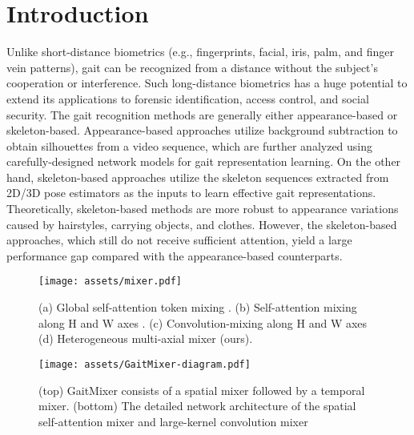 \documentclass{article}
\begin{document}
\section{Introduction}
Unlike short-distance biometrics (e.g., fingerprints, facial, iris, palm, and finger vein patterns), gait can be recognized from a distance without the subject's cooperation or interference.
Such long-distance biometrics has a huge potential to extend its applications to forensic identification, access control, and social security. The gait recognition methods are generally  either appearance-based or skeleton-based. Appearance-based approaches \cite{GaitNet}\cite{GaitSet}\cite{GaitPart}\cite{cross_view_cnn_silhouette} utilize background subtraction to obtain silhouettes from a video sequence, which are further analyzed using carefully-designed network models for gait representation learning. 
On the other hand, skeleton-based approaches \cite{PTSN}\cite{GaitGraph}\cite{GaitGraph2} utilize the skeleton sequences extracted from 2D/3D pose estimators as the inputs to learn effective gait representations. Theoretically,  skeleton-based methods are more robust to appearance variations caused by hairstyles, carrying objects, and clothes. However,  the skeleton-based approaches, which still do not receive sufficient attention, yield a large performance gap compared with the appearance-based counterparts. 




\begin{figure}[t]
\centerline{\texttt{[image: assets/mixer.pdf]}}
\caption{(a) Global self-attention token mixing \cite{ViT}. (b) Self-attention mixing along H and W axes \cite{ViViT}. (c) Convolution-mixing along H and W axes \cite{GaitGraph} (d) Heterogeneous multi-axial mixer (ours). }
\label{fig:mixer}
\end{figure}



\begin{figure*}[ht]
 \centering
  \texttt{[image: assets/GaitMixer-diagram.pdf]}
  \caption{(top) GaitMixer consists of a spatial mixer followed by a temporal mixer. (bottom) The detailed network architecture of the spatial self-attention mixer and large-kernel convolution mixer}
  \label{fig:architecture}
\end{figure*}
\end{document}
